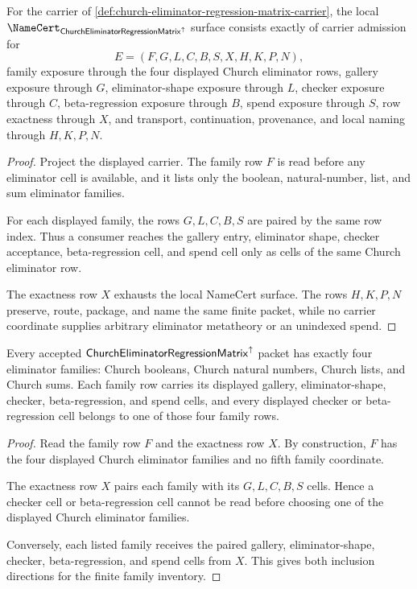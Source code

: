\begin{theorem}
\label{thm:church-eliminator-regression-matrix-namecert-obligations}
For the carrier of \autoref{def:church-eliminator-regression-matrix-carrier}, the local $\NameCert_{\ChurchEliminatorRegressionMatrixUp}$ surface consists exactly of carrier admission for
$$
E=(F,G,L,C,B,S,X,H,K,P,N),
$$
family exposure through the four displayed Church eliminator rows, gallery exposure through $G$, eliminator-shape exposure through $L$, checker exposure through $C$, beta-regression exposure through $B$, spend exposure through $S$, row exactness through $X$, and transport, continuation, provenance, and local naming through $H,K,P,N$.
\end{theorem}
\begin{proof}
Project the displayed carrier. The family row $F$ is read before any eliminator cell is available, and it lists only the boolean, natural-number, list, and sum eliminator families.

For each displayed family, the rows $G,L,C,B,S$ are paired by the same row index. Thus a consumer reaches the gallery entry, eliminator shape, checker acceptance, beta-regression cell, and spend cell only as cells of the same Church eliminator row.

The exactness row $X$ exhausts the local NameCert surface. The rows $H,K,P,N$ preserve, route, package, and name the same finite packet, while no carrier coordinate supplies arbitrary eliminator metatheory or an unindexed spend.
\end{proof}

\begin{theorem}
\label{thm:church-eliminator-regression-matrix-family-exactness}
Every accepted $\mathsf{ChurchEliminatorRegressionMatrix}^{\uparrow}$ packet has exactly four eliminator families: Church booleans, Church natural numbers, Church lists, and Church sums. Each family row carries its displayed gallery, eliminator-shape, checker, beta-regression, and spend cells, and every displayed checker or beta-regression cell belongs to one of those four family rows.
\end{theorem}
\begin{proof}
Read the family row $F$ and the exactness row $X$. By construction, $F$ has the four displayed Church eliminator families and no fifth family coordinate.

The exactness row $X$ pairs each family with its $G,L,C,B,S$ cells. Hence a checker cell or beta-regression cell cannot be read before choosing one of the displayed Church eliminator families.

Conversely, each listed family receives the paired gallery, eliminator-shape, checker, beta-regression, and spend cells from $X$. This gives both inclusion directions for the finite family inventory.
\end{proof}

